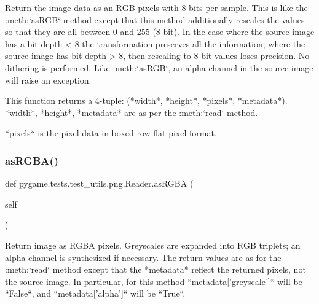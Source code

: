 \begin{DoxyVerb}Return the image data as an RGB pixels with 8-bits per
sample.  This is like the :meth:`asRGB` method except that
this method additionally rescales the values so that they
are all between 0 and 255 (8-bit).  In the case where the
source image has a bit depth < 8 the transformation preserves
all the information; where the source image has bit depth
> 8, then rescaling to 8-bit values loses precision.  No
dithering is performed.  Like :meth:`asRGB`, an alpha channel
in the source image will raise an exception.

This function returns a 4-tuple:
(*width*, *height*, *pixels*, *metadata*).
*width*, *height*, *metadata* are as per the :meth:`read` method.

*pixels* is the pixel data in boxed row flat pixel format.
\end{DoxyVerb}
 \mbox{\label{classpygame_1_1tests_1_1test__utils_1_1png_1_1_reader_aec666034f00886076fadaec1950b29f9}} 
\subsubsection{\texorpdfstring{as\+R\+G\+B\+A()}{asRGBA()}}
{\footnotesize\ttfamily def pygame.\+tests.\+test\+\_\+utils.\+png.\+Reader.\+as\+R\+G\+BA (\begin{DoxyParamCaption}\item[{}]{self }\end{DoxyParamCaption})}

\begin{DoxyVerb}Return image as RGBA pixels.  Greyscales are expanded into
RGB triplets; an alpha channel is synthesized if necessary.
The return values are as for the :meth:`read` method
except that the *metadata* reflect the returned pixels, not the
source image.  In particular, for this method
``metadata['greyscale']`` will be ``False``, and
``metadata['alpha']`` will be ``True``.
\end{DoxyVerb}
 \mbox{\label{classpygame_1_1tests_1_1test__utils_1_1png_1_1_reader_a4f3cdf4fb0a2c259cde35efad51e22f2}} 
